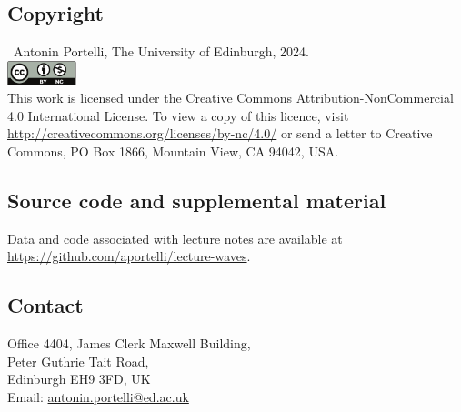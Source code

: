 \documentclass[a4paper,12pt]{book}
\theoremstyle{plain}
\theoremstyle{plain}
\theoremstyle{plain}
\theoremstyle{plain}
\theoremstyle{definition}
\theoremstyle{definition}
\begin{document}
{ \footnotesize %
  \subsection*{Copyright}
  \textcopyright~Antonin Portelli, The University of Edinburgh, 2024.
  \vspace*{10pt}\\
  \noindent\includegraphics[width=2cm]{by-nc.pdf}\\
  This work is licensed under the Creative Commons
  Attribution-NonCommercial 4.0 International
  License. To view a copy of this licence, visit
  \url{http://creativecommons.org/licenses/by-nc/4.0/} or send a
  letter to Creative Commons, PO
  Box 1866, Mountain View, CA 94042, USA.

  \subsection*{Source code and supplemental material}
  Data and code associated with lecture notes are available at
  \url{https://github.com/aportelli/lecture-waves}.

  \subsection*{Contact}
  Office 4404, James Clerk Maxwell Building,\\
  Peter Guthrie Tait Road,\\
  Edinburgh EH9 3FD, UK\\
  Email: \href{mailto:antonin.portelli@ed.ac.uk}{antonin.portelli@ed.ac.uk}

  \vfill
}
\end{document}
